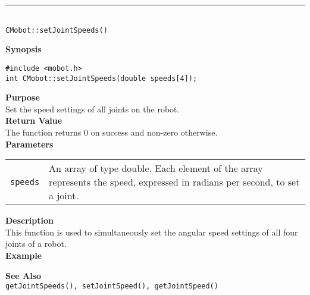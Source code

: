 \noindent
\vspace{5pt}
\rule{4.5in}{0.015in}\\
\noindent
{\LARGE \texttt{CMobot::setJointSpeeds()}}\\
{}

\noindent
{\bf Synopsis}
\vspace{-8pt}
\begin{verbatim}
#include <mobot.h>
int CMobot::setJointSpeeds(double speeds[4]);
\end{verbatim}

\noindent
{\bf Purpose}\\
Set the speed settings of all joints on the robot.\\

\noindent
{\bf Return Value}\\
The function returns 0 on success and non-zero otherwise.\\

\noindent
{\bf Parameters}
\vspace{-0.1in}
\begin{description}
\item               
\begin{tabular}{p{10 mm}p{145 mm}}
\texttt{speeds} & An array of type double. Each element of the array
represents the speed, expressed in radians per second, to set a joint. \\
\end{tabular}
\end{description}

\noindent
{\bf Description}\\
This function is used to simultaneously set the angular speed settings of
all four joints of a robot. \\

\noindent
{\bf Example}\\
\noindent

\noindent
{\bf See Also}\\
\texttt{getJointSpeeds(), setJointSpeed(), getJointSpeed()}

